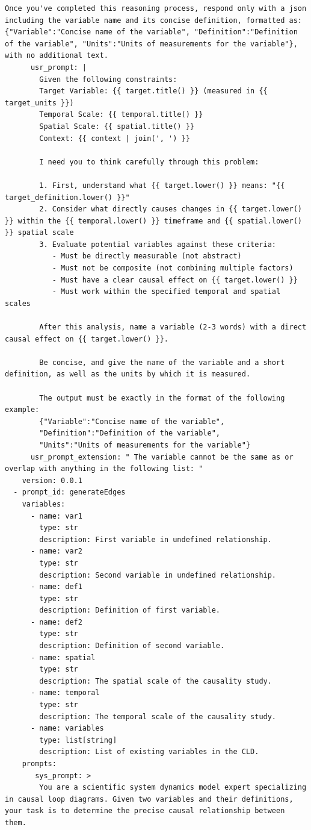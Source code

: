 \begin{lstlisting}[caption={Generator Prompt Configuration: Nitai\_C (\texttt{generateNodes} + \texttt{generateEdges})},label={lst:generator_nitai_c_yaml}]
        Once you've completed this reasoning process, respond only with a json including the variable name and its concise definition, formatted as: {"Variable":"Concise name of the variable", "Definition":"Definition of the variable", "Units":"Units of measurements for the variable"}, with no additional text.
      usr_prompt: |
        Given the following constraints:
        Target Variable: {{ target.title() }} (measured in {{ target_units }})
        Temporal Scale: {{ temporal.title() }}
        Spatial Scale: {{ spatial.title() }}
        Context: {{ context | join(', ') }}
        
        I need you to think carefully through this problem:
        
        1. First, understand what {{ target.lower() }} means: "{{ target_definition.lower() }}"
        2. Consider what directly causes changes in {{ target.lower() }} within the {{ temporal.lower() }} timeframe and {{ spatial.lower() }} spatial scale
        3. Evaluate potential variables against these criteria:
           - Must be directly measurable (not abstract)
           - Must not be composite (not combining multiple factors)
           - Must have a clear causal effect on {{ target.lower() }}
           - Must work within the specified temporal and spatial scales
        
        After this analysis, name a variable (2-3 words) with a direct causal effect on {{ target.lower() }}.
        
        Be concise, and give the name of the variable and a short definition, as well as the units by which it is measured.
        
        The output must be exactly in the format of the following example: 
        {"Variable":"Concise name of the variable", 
        "Definition":"Definition of the variable", 
        "Units":"Units of measurements for the variable"}
      usr_prompt_extension: " The variable cannot be the same as or overlap with anything in the following list: "
    version: 0.0.1
  - prompt_id: generateEdges
    variables:
      - name: var1
        type: str
        description: First variable in undefined relationship.
      - name: var2
        type: str
        description: Second variable in undefined relationship.
      - name: def1
        type: str
        description: Definition of first variable.
      - name: def2
        type: str
        description: Definition of second variable.
      - name: spatial
        type: str
        description: The spatial scale of the causality study.
      - name: temporal
        type: str
        description: The temporal scale of the causality study.
      - name: variables
        type: list[string]
        description: List of existing variables in the CLD.
    prompts:
       sys_prompt: >
        You are a scientific system dynamics model expert specializing in causal loop diagrams. Given two variables and their definitions, your task is to determine the precise causal relationship between them.
        

\end{lstlisting}
